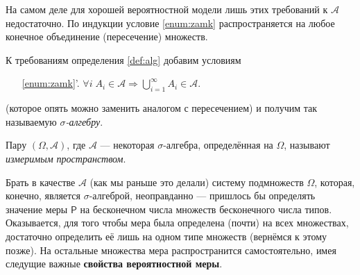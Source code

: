 На самом деле для хорошей вероятностной
модели лишь этих требований к $ \mathscr A $ недостаточно. 
По индукции условие \ref{enum:zamk} распространяется на любое конечное
объединение (пересечение) множеств. 

\begin{definition}
	К требованиям определения \ref{def:alg} добавим условиям
\begin{enumerate}
	\item[\ref{enum:zamk}'.] $ \forall i \; A_i \in \mathscr A \Rightarrow \bigcup\limits_{i=1}^\infty A_i \in
		\mathscr A $.
\end{enumerate}
(которое опять можно заменить аналогом с пересечением) и получим так
называемую \emph{$ \sigma $-алгебру}.
\end{definition}

\begin{definition}
Пару $ (\Omega, \mathscr A) $, где $ \mathscr A $ --- некоторая $ \sigma
$-алгебра, определённая на $ \Omega $, называют \emph{измеримым пространством}.
\end{definition}


Брать в качестве $ \mathscr A $ (как мы раньше это делали) систему подмножеств
$ \Omega $, которая, конечно, является $ \sigma $-алгеброй, неоправданно --- пришлось
бы определять значение меры $ \mathsf P $ на бесконечном числа множеств
бесконечного числа типов.
Оказывается, для того чтобы мера была определена (почти) на всех множествах,
достаточно определить её лишь на одном типе множеств (вернёмся к этому позже). На остальные множества
мера распространится самостоятельно, имея следущие важные \textbf{свойства
вероятностной меры}.

